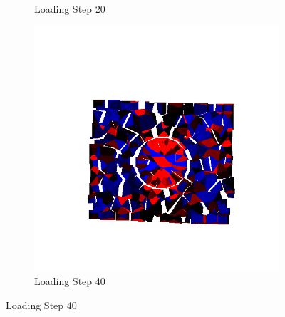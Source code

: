 \begin{figure}[ht!]
\begin{subfigure}{.33\textwidth}
      \caption{Loading Step 20}
      \end{subfigure}%
      \begin{subfigure}{.33\textwidth}
        \centering
        \includegraphics[width=1.0\linewidth]{Files/Small_ASR/Free_IS2/DEP5-STEP(060).png}
        \caption{Loading Step 40}
      \end{subfigure}


\end{figure}
